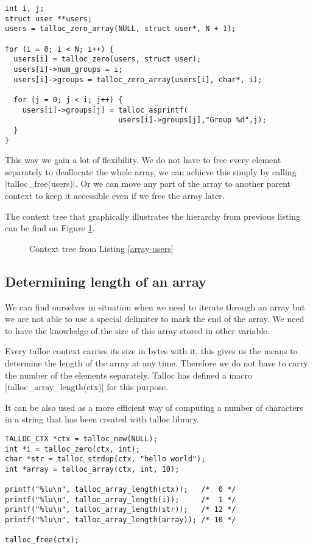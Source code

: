 \begin{lstlisting}[caption={Array of users and context hierarchy},
label={array-users}] int i, j;
struct user **users;
users = talloc_zero_array(NULL, struct user*, N + 1);

for (i = 0; i < N; i++) {
  users[i] = talloc_zero(users, struct user);
  users[i]->num_groups = i;
  users[i]->groups = talloc_zero_array(users[i], char*, i);
  
  for (j = 0; j < i; j++) {
    users[i]->groups[j] = talloc_asprintf(
                          users[i]->groups[j],"Group %d",j);
  }
}
\end{lstlisting}

This way we gain a lot of flexibility. We do not have to free every element
separately to deallocate the whole array, we can achieve this simply by calling
|talloc_free(users)|. Or we can move any part of the array to another parent
context to keep it accessible even if we free the array later.

The context tree that graphically illustrates the hierarchy from previous
listing can be find on Figure \ref{fig:context-tree-users}.

\begin{figure}[H]
  \centering
  
  \caption{Context tree from Listing \ref{array-users}}
  \label{fig:context-tree-users}
\end{figure}

\subsection{Determining length of an array}

We can find ourselves in situation when we need to iterate through an array but
we are not able to use a special delimiter to mark the end of the array. We need
to have the knowledge of the size of this array stored in other variable.

Every talloc context carries its size in bytes with it, this gives us the means
to determine the length of the array at any time. Therefore we do not have to
carry the number of the elements separately. Talloc has defined a macro
|talloc_array_length(ctx)| for this purpose.

It can be also used as a more efficient way of computing a number of characters
in a string that has been created with talloc library.

\begin{lstlisting}[caption={Length of an array},label=lst:array-length]
TALLOC_CTX *ctx = talloc_new(NULL);
int *i = talloc_zero(ctx, int);
char *str = talloc_strdup(ctx, "hello world");
int *array = talloc_array(ctx, int, 10);

printf("%lu\n", talloc_array_length(ctx));   /*  0 */
printf("%lu\n", talloc_array_length(i));     /*  1 */
printf("%lu\n", talloc_array_length(str));   /* 12 */
printf("%lu\n", talloc_array_length(array)); /* 10 */

talloc_free(ctx);
\end{lstlisting}
